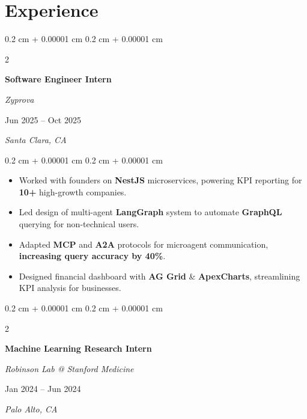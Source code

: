 \documentclass[10pt, letterpaper]{article}
\newenvironment{highlights}{
    \begin{itemize}[
        topsep=0.10 cm,
        parsep=0.10 cm,
        partopsep=0pt,
        itemsep=0pt,
        leftmargin=0.4 cm + 10pt
    ]
}{
    \end{itemize}
} %
\newenvironment{onecolentry}{
    \begin{adjustwidth}{
        0.2 cm + 0.00001 cm
    }{
        0.2 cm + 0.00001 cm
    }
}{
    \end{adjustwidth}
} %
\newenvironment{twocolentry}[2][]{
    \onecolentry
    \def\secondColumn{#2}
    \setcolumnwidth{\fill, 5 cm}
    \begin{paracol}{2}
}{
    \switchcolumn \raggedleft \secondColumn
    \end{paracol}
    \endonecolentry
} %
\let\hrefWithoutArrow\href
\renewcommand{\href}[2]{\hrefWithoutArrow{#1}{\ifthenelse{\equal{#2}{}}{ }{#2 }\raisebox{.15ex}{\footnotesize \faExternalLink*}}}
\begin{document}
    
    \section{Experience}



        
        \begin{twocolentry}{
        Jun 2025 – Oct 2025 
            
        \textit{Santa Clara, CA}}
            \textbf{Software Engineer Intern}
            
            \textit{Zyprova}
        \end{twocolentry}

        \vspace{0.10 cm}
        \begin{onecolentry}
            \begin{highlights}
                \item Worked with founders on \textbf{NestJS} microservices, powering KPI reporting for \textbf{10+} high-growth companies.
                \item Led design of multi-agent \textbf{LangGraph} system to automate \textbf{GraphQL} querying for non-technical users.
                \item Adapted \textbf{MCP} and \textbf{A2A} protocols for microagent communication, \textbf{increasing query accuracy by 40\%}.
                \item Designed financial dashboard with \textbf{AG Grid} \& \textbf{ApexCharts}, streamlining KPI analysis for businesses.
            \end{highlights}
        \end{onecolentry}


        \vspace{0.3 cm}

        \begin{twocolentry}{
        Jan 2024 – Jun 2024    
            
        \textit{Palo Alto, CA}}
            \textbf{Machine Learning Research Intern}
            
            \textit{Robinson Lab @ Stanford Medicine}
        \end{twocolentry}
\end{document}

